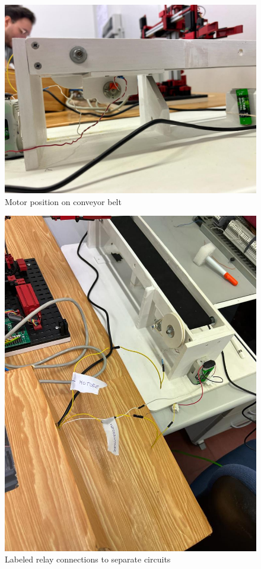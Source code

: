 \documentclass[a4paper,11pt]{report}
\theoremstyle{definition}
\theoremstyle{plain}
\begin{document}
                \begin{figure}[H]
                    \centering
                    \includegraphics[scale=0.3]{images/motorposition.jpeg}
                    \caption{Motor position on conveyor belt}
                \end{figure}
                \begin{figure}[H]
                    \centering
                    \includegraphics[scale=0.35]{images/namewires.jpeg}
                    \caption{Labeled relay connections to separate circuits}
                \end{figure}
\end{document}
